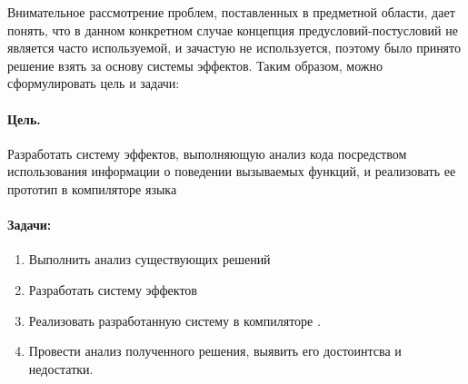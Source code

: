 Внимательное рассмотрение проблем, поставленных в предметной области, дает понять, что в данном конкретном случае концепция предусловий-постусловий не является часто используемой, и зачастую не используется, поэтому было принято решение взять за основу системы эффектов. Таким образом, можно сформулировать цель и задачи:


\paragraph{Цель.} Разработать систему эффектов, выполняющую анализ кода посредством использования информации о поведении вызываемых функций, и реализовать ее прототип в компиляторе языка 

\paragraph{Задачи:}

\begin{enumerate}
  \item Выполнить анализ существующих решений

  \item Разработать систему эффектов

  \item Реализовать разработанную систему в компиляторе .

  \item Провести анализ полученного решения, выявить его достоинтсва и недостатки.
\end{enumerate}
